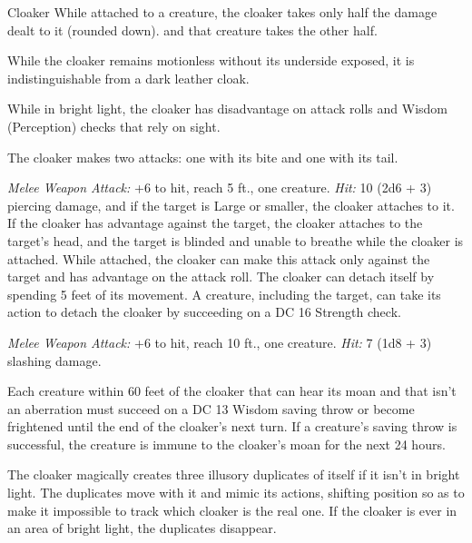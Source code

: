 \documentclass[10pt,a4paper,twoside,twocolumn,openany,nodeprecatedcode]{dndbook}
\begin{document}
\begin{DndMonster}[float=ht]{Cloaker}
\DndMonsterBasics[
armor-class = {14 (natural armor)},
hit-points = {\DndDice{12d10 + 12}},
speed = {10 ft., 40 ft. (key)}
]
\DndMonsterAbilityScores[
 str = 17,
 dex = 15,
 con = 12,
 int = 13,
 wis = 12,
 cha = 14
]
\DndMonsterDetails[
skills = {Stealth +5},
senses = {darkvision 60 ft., passive perception 11},
languages = {Deep Speech, Undercommon},
challenge = 8,
]
While attached to a creature, the cloaker takes only half the damage dealt to it (rounded down). and that creature takes the other half.

While the cloaker remains motionless without its underside exposed, it is indistinguishable from a dark leather cloak.

While in bright light, the cloaker has disadvantage on attack rolls and Wisdom (Perception) checks that rely on sight.

\par
{}
The cloaker makes two attacks: one with its bite and one with its tail.

\textsl{Melee Weapon Attack:} +6 to hit, reach 5 ft., one creature. \textsl{Hit:} 10 (2d6 + 3) piercing damage, and if the target is Large or smaller, the cloaker attaches to it. If the cloaker has advantage against the target, the cloaker attaches to the target's head, and the target is blinded and unable to breathe while the cloaker is attached. While attached, the cloaker can make this attack only against the target and has advantage on the attack roll. The cloaker can detach itself by spending 5 feet of its movement. A creature, including the target, can take its action to detach the cloaker by succeeding on a DC 16 Strength check.

\textsl{Melee Weapon Attack:} +6 to hit, reach 10 ft., one creature. \textsl{Hit:} 7 (1d8 + 3) slashing damage.

Each creature within 60 feet of the cloaker that can hear its moan and that isn't an aberration must succeed on a DC 13 Wisdom saving throw or become frightened until the end of the cloaker's next turn. If a creature's saving throw is successful, the creature is immune to the cloaker's moan for the next 24 hours.

The cloaker magically creates three illusory duplicates of itself if it isn't in bright light. The duplicates move with it and mimic its actions, shifting position so as to make it impossible to track which cloaker is the real one. If the cloaker is ever in an area of bright light, the duplicates disappear.


\end{DndMonster}
\end{document}

